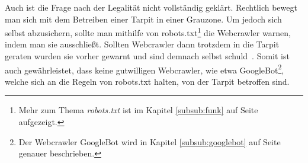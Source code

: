 Auch ist die Frage nach der Legalität nicht vollständig geklärt. Rechtlich bewegt man sich mit dem Betreiben einer Tarpit in einer Grauzone. Um jedoch sich selbst abzusichern, sollte man mithilfe von robots.txt\footnote{Mehr zum Thema \emph{robots.txt} ist im Kapitel \ref{subsub:funk} auf Seite \pageref{subsub:funk} aufgezeigt.} die Webcrawler \glqq warnen\grqq , indem man sie ausschließt. Sollten Webcrawler dann trotzdem in die Tarpit geraten wurden sie vorher gewarnt und sind demnach \glqq selbst schuld\grqq\ \cite{honeypot-tarpit-synonym}. Somit ist auch gewährleistet, dass keine gutwilligen Webcrawler, wie etwa GoogleBot\footnote{Der Webcrawler GoogleBot wird in Kapitel \ref{subsub:googlebot} auf Seite  \pageref{subsub:googlebot} genauer beschrieben.}, welche sich an die Regeln von robots.txt halten, von der Tarpit betroffen sind\cite{tarpitting-http-eggendorf-auugn}.
\label{subsub:http-tarpit}